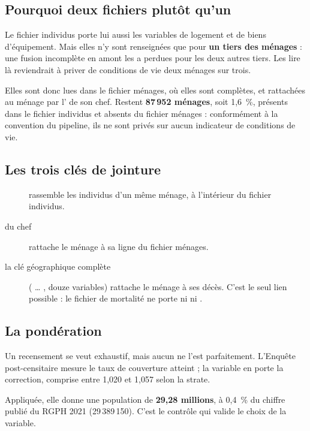 \documentclass[11pt,a4paper]{article}
\begin{document}
\subsection{Pourquoi deux fichiers plutôt qu'un}

Le fichier individus porte lui aussi les variables de logement et de biens d'équipement. Mais
elles n'y sont renseignées que pour \textbf{un tiers des ménages} : une fusion incomplète en amont
les a perdues pour les deux autres tiers. Les lire là reviendrait à priver de conditions de vie
deux ménages sur trois.

Elles sont donc lues dans le fichier ménages, où elles sont complètes, et rattachées au ménage par
l' de son chef. Restent \textbf{87\,952 ménages}, soit 1,6~\%, présents dans le
fichier individus et absents du fichier ménages : conformément à la convention du pipeline, ils ne
sont privés sur aucun indicateur de conditions de vie.

\subsection{Les trois clés de jointure}

\begin{description}
  \item[] rassemble les individus d'un même ménage, à l'intérieur du fichier
    individus.
  \item[ du chef] rattache le ménage à sa ligne du fichier ménages.
  \item[la clé géographique complète] ( \dots{} , douze variables) rattache le
    ménage à ses décès. C'est le seul lien possible : le fichier de mortalité ne porte ni
     ni .
\end{description}

\subsection{La pondération}

Un recensement se veut exhaustif, mais aucun ne l'est parfaitement. L'Enquête post-censitaire
mesure le taux de couverture atteint ; la variable  en porte la correction, comprise entre
1,020 et 1,057 selon la strate.

Appliquée, elle donne une population de \textbf{29,28 millions}, à 0,4~\% du chiffre publié du RGPH
2021 (29\,389\,150). C'est le contrôle qui valide le choix de la variable.
\end{document}
